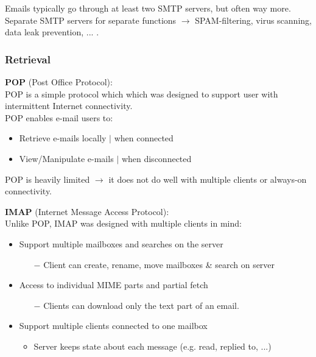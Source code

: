 \documentclass[a4paper, fontsize=8pt, landscape, DIV=1]{scrartcl}
\begin{document}
\begin{multicols*}{4}
		Emails typically go through at least two SMTP servers, but often way more.
		Separate SMTP servers for separate functions $\rightarrow$ SPAM-filtering, virus
		scanning, data leak prevention, ... .\\
		
		\subsubsection{Retrieval}
		\textbf{POP} (Post Office Protocol):\\
		POP is a simple protocol which which was designed to support user with
		intermittent Internet connectivity.\\
		POP enables e-mail users to:
		\begin{itemize}[noitemsep]
			\item Retrieve e-mails locally $\vert$ when connected
			\item View/Manipulate e-mails $\vert$ when disconnected
		\end{itemize} 
		POP is heavily limited $\rightarrow$ it does not do well with multiple clients
		or always-on connectivity.\par 
		
		\textbf{IMAP} (Internet Message Access Protocol):\\
		Unlike POP, IMAP was designed with multiple clients in mind: 
		\begin{itemize}[noitemsep]
			\item Support multiple mailboxes and searches on the server
			\begin{itemize}
				\item[$-$] Client can create, rename, move mailboxes \& search on server
			\end{itemize}
			\item Access to individual MIME parts and partial fetch
			\begin{itemize}
				\item[$-$] Clients can download only the text part of an email. 
			\end{itemize}
			\item Support multiple clients connected to one mailbox
			\begin{itemize}
				\item Server keeps state about each message (e.g. read, replied to, ...)
			\end{itemize}
		\end{itemize} 
		
		
		
		
		
	\end{multicols*}
	\setcounter{secnumdepth}{3}
\end{document}
